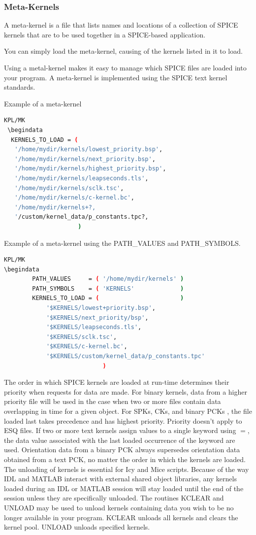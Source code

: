\documentclass[crop=false,class=book]{standalone}
\begin{document}
\subsubsection{Meta-Kernels}
\begin{definition}
A meta-kernel is a file that lists names and locations of a collection of SPICE kernels that are to be used together in a SPICE-based application.
\end{definition}
\begin{remark}
You can simply load the meta-kernel, causing of the kernels listed in it to load.
\end{remark}
Using a metal-kernel makes it easy to manage which SPICE files are loaded into your program. A meta-kernel is implemented using the SPICE text kernel standards.
\begin{example}
Example of a meta-kernel
\begin{lstlisting}[language=bash,basicstyle=\footnotesize]
KPL/MK
 \begindata
  KERNELS_TO_LOAD = (
   '/home/mydir/kernels/lowest_priority.bsp',
   '/home/mydir/kernels/next_priority.bsp',
   '/home/mydir/kernels/highest_priority.bsp',
   '/home/mydir/kernels/leapseconds.tls',
   '/home/mydir/kernels/sclk.tsc',
   '/home/mydir/kernels/c-kernel.bc',
   '/home/mydir/kernels+?,
   '/custom/kernel_data/p_constants.tpc?,
                     )
\end{lstlisting}
Example of a meta-kernel using the PATH\_VALUES and PATH\_SYMBOLS.
\begin{lstlisting}[language=bash,basicstyle=\footnotesize]
KPL/MK
\begindata  
        PATH_VALUES     = ( '/home/mydir/kernels' )
        PATH_SYMBOLS    = ( 'KERNELS'             )
        KERNELS_TO_LOAD = (                       )
            '$KERNELS/lowest+priority.bsp',
            '$KERNELS/next_priority/bsp',
            '$KERNELS/leapseconds.tls',
            '$KERNELS/sclk.tsc',
            '$KERNELS/c-kernel.bc',
            '$KERNELS/custom/kernel_data/p_constants.tpc'
                            )
\end{lstlisting}
\end{example}
The order in which SPICE kernels are loaded at run-time determines their priority when requests for data are made. For binary kernels, data from a higher priority file will be used in the case when two or more files contain data overlapping in time for a given object. For SPKs, CKs, and binary PCKs , the file loaded last takes precedence and has highest priority. Priority doesn't apply to ESQ files. If two or more text kernels assign values to a single keyword using $=$, the data value associated with the last loaded occurrence of the keyword are used. Orientation data from a binary PCK always supersedes orientation data obtained from a text PCK, no matter the order in which the kernels are loaded. The unloading of kernels is essential for Icy and Mice scripts. Because of the way IDL and MATLAB interact with external shared object libraries, any kernels loaded during an IDL or MATLAB session will stay loaded until the end of the session unless they are specifically unloaded. The routines KCLEAR and UNLOAD may be used to unload kernels containing data you wish to be no longer available in your program. KCLEAR unloads all kernels and clears the kernel pool. UNLOAD unloads specified kernels.
\end{document}
